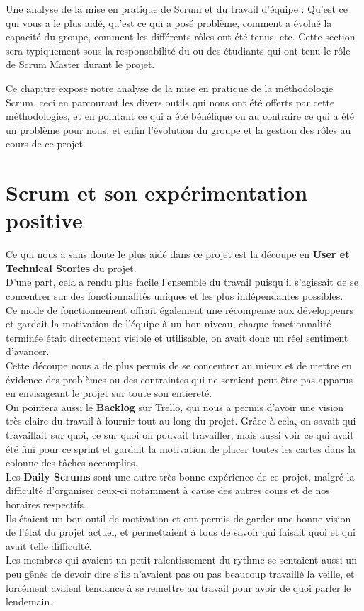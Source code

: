 \documentclass{report}
\begin{document}
	Une analyse de la mise en pratique de Scrum et du travail d’équipe : Qu’est ce qui vous a le plus aidé, qu’est ce qui a posé problème, comment a évolué la capacité du groupe, comment les différents rôles ont été tenus, etc.  Cette section sera typiquement sous la responsabilité du ou des étudiants qui ont tenu le rôle de Scrum Master durant le projet.

	Ce chapitre expose notre analyse de la mise en pratique de la méthodologie Scrum, ceci en parcourant les divers outils qui nous ont été offerts par cette méthodologies, et en pointant ce qui a été bénéfique ou au contraire ce qui a été un problème pour nous, et enfin l'évolution du groupe et la gestion des rôles au cours de ce projet.\\

	\section{Scrum et son expérimentation positive}

		Ce qui nous a sans doute le plus aidé dans ce projet est la découpe en \textbf{User et Technical Stories} du projet.\\
		D'une part, cela a rendu plus facile l'ensemble du travail puisqu'il s'agissait de se concentrer sur des fonctionnalités uniques et les plus indépendantes possibles.\\
		Ce mode de fonctionnement offrait également une récompense aux développeurs et gardait la motivation de l'équipe à un bon niveau, chaque fonctionnalité terminée était directement visible et utilisable, on avait donc un réel sentiment d'avancer.\\
		Cette découpe nous a de plus permis de se concentrer au mieux et de mettre en évidence des problèmes ou des contraintes qui ne seraient peut-être pas apparus en envisageant le projet sur toute son entiereté.\\

		On pointera aussi le \textbf{Backlog} sur Trello, qui nous a permis d'avoir une vision très claire du travail à fournir tout au long du projet. Grâce à cela, on savait qui travaillait sur quoi, ce sur quoi on pouvait travailler, mais aussi voir ce qui avait été fini pour ce sprint et gardait la motivation de placer toutes les cartes dans la colonne des tâches accomplies.\\

		Les \textbf{Daily Scrums} sont une autre très bonne expérience de ce projet, malgré la difficulté d'organiser ceux-ci notamment à cause des autres cours et de nos horaires respectifs.\\
		Ils étaient un bon outil de motivation et ont permis de garder une bonne vision de l'état du projet actuel, et permettaient à tous de savoir qui faisait quoi et qui avait telle difficulté.\\
		Les membres qui avaient un petit ralentissement du rythme se sentaient aussi un peu gênés de devoir dire s'ils n'avaient pas ou pas beaucoup travaillé la veille, et forcément avaient tendance à se remettre au travail pour avoir de quoi parler le lendemain.\\
\end{document}
